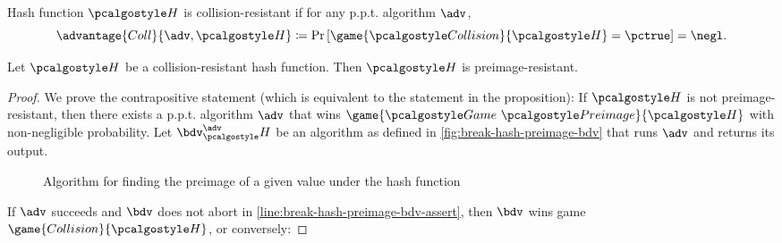 \begin{definition}
  Hash function $\algo{H}$ is collision-resistant if for any p.p.t. algorithm $\adv$,
 \[
  \advantage{Coll}{\adv, \algo{H}} \defeq \pr{\game{\algo{Collision}}{\algo{H}} = \pctrue} = \negl.
 \]
\end{definition}

\begin{lemma}
  Let $\algo{H}$ be a collision-resistant hash function. Then $\algo{H}$ is preimage-resistant.
\end{lemma}
\begin{proof}
  We prove the contrapositive statement (which is equivalent to the statement in the proposition):
  If $\algo{H}$ is not preimage-resistant, then there exists a p.p.t. algorithm $\adv$ that wins $\game{\Game~\algo{Preimage}}{\algo{H}}$ with non-negligible probability.
  Let $\bdv^\adv_\algo{H}$ be an algorithm as defined in \autoref{fig:break-hash-preimage-bdv} that runs $\adv$ and returns its output.
  \begin{figure}[tbhp]
  \begin{center}
    \begin{tcolorbox}[width=4cm]
      \begin{pchstack}[center]
      \end{pchstack}
    \end{tcolorbox}
  \end{center}
  \caption{Algorithm for finding the preimage of a given value under the hash function \label{fig:break-hash-preimage-bdv}}
  \end{figure}
  If $\adv$ succeeds and $\bdv$ does not abort in \cref{line:break-hash-preimage-bdv-assert}, then $\bdv$ wins game $\game{Collision}{\algo{H}}$, or conversely:


\end{proof}
